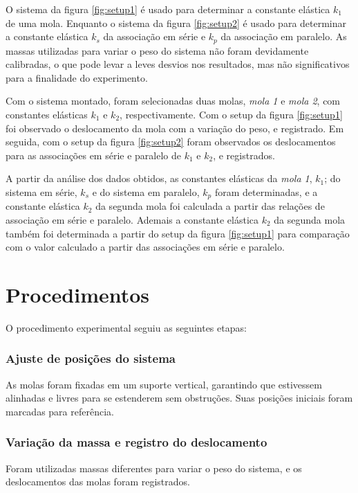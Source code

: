 \documentclass[12pt,a4paper]{article}
\begin{document}
O sistema da figura \ref{fig:setup1} é usado para determinar a constante elástica $k_1$ de uma mola. Enquanto o sistema da figura \ref{fig:setup2} é usado para determinar a constante elástica $k_{s}$ da associação em série e $k_{p}$ da associação em paralelo. As massas utilizadas para variar o peso do sistema não foram devidamente calibradas, o que pode levar a leves desvios nos resultados, mas não significativos para a finalidade do experimento. 

Com o sistema montado, foram selecionadas duas molas, \textit{mola 1} e \textit{mola 2}, com constantes elásticas $k_1$ e $k_2$, respectivamente. Com o setup da figura \ref{fig:setup1} foi observado o deslocamento da mola com a variação do peso, e registrado. Em seguida, com o setup da figura \ref{fig:setup2} foram observados os deslocamentos para as associações em série e paralelo de $k_1$ e $k_2$, e registrados.

A partir da análise dos dados obtidos, as constantes elásticas da \textit{mola 1}, $k_1$; do sistema em série, $k_s$ e do sistema em paralelo, $k_p$ foram determinadas, e a constante elástica $k_2$ da segunda mola foi calculada a partir das relações de associação em série e paralelo. Ademais a constante elástica $k_2$ da segunda mola também foi determinada a partir do setup da figura \ref{fig:setup1} para comparação com o valor calculado a partir das associações em série e paralelo.

\section{Procedimentos}

O procedimento experimental seguiu as seguintes etapas:

\subsubsection{Ajuste de posições do sistema}
As molas foram fixadas em um suporte vertical, garantindo que estivessem alinhadas e livres para se estenderem sem obstruções. Suas posições iniciais foram marcadas para referência.

\subsubsection{Variação da massa e registro do deslocamento}
Foram utilizadas massas diferentes para variar o peso do sistema, e os deslocamentos das molas foram registrados.
\end{document}
